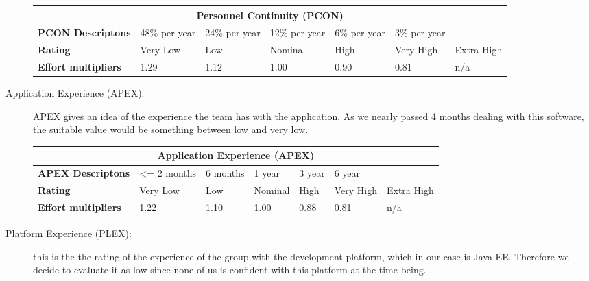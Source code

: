 \begin{description}
\begin{tabular}{|p{}|p{}|p{}|p{}|p{}|p{}|p{}|}
\hline
         \multicolumn{7}{|c|}{\textbf{Personnel Continuity (PCON)}} \\ \hline  \hline
         	\textbf{PCON Descriptons} & 48\% per year&24\% per year&12\% per year&6\% per year&3\% per year&\\ \hline
	\textbf{Rating}&Very Low & Low & Nominal  & High & Very High &Extra High\\ \hline
	\textbf{Effort multipliers} & 1.29 & 1.12& 1.00 & 0.90 & 0.81 & n/a \\ \hline
\end{tabular}

\item[Application Experience (APEX):] APEX gives an idea of the experience the team has with the application. As we nearly passed 4 months dealing with this software, the suitable value would be something between low and very low.

\begin{tabular}{|p{}|p{}|p{}|p{}|p{}|p{}|p{}|}
\hline
         \multicolumn{7}{|c|}{\textbf{Application Experience (APEX)}} \\ \hline  \hline
         	\textbf{APEX Descriptons} & <= 2 months & 6 months&1 year & 3 year& 6 year&\\ \hline
	\textbf{Rating}&Very Low & Low & Nominal  & High & Very High &Extra High\\ \hline
	\textbf{Effort multipliers} & 1.22 & 1.10 & 1.00 & 0.88 & 0.81 & n/a \\ \hline
\end{tabular}

\item[Platform Experience (PLEX):] this is the the rating of the experience of the group with the development platform, which in our case is Java EE. Therefore we decide to evaluate it as low since none of us is confident with this platform at the time being.


\end{description}
